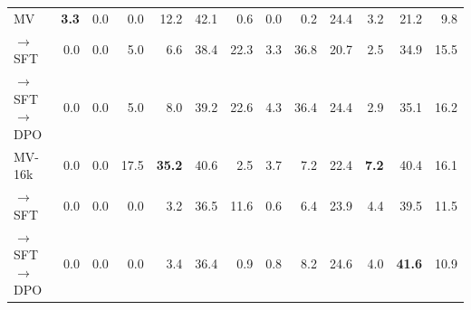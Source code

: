 \begin{table}[ht]
{\begin{tabular}{lrrrrrrrrrrrr}
\midrule
\addlinespace[0.3em]
MV & \textbf{3.3} & 0.0 & 0.0 & 12.2 & 42.1 & 0.6 & 0.0 & 0.2 & 24.4 & 3.2 & 21.2 & 9.8 \\
\quad $\to$ SFT & 0.0 & 0.0 & 5.0 & 6.6 & 38.4 & 22.3 & 3.3 & 36.8 & 20.7 & 2.5 & 34.9 & 15.5 \\
\quad $\to$ SFT $\to$ DPO & 0.0 & 0.0 & 5.0 & 8.0 & 39.2 & 22.6 & 4.3 & 36.4 & 24.4 & 2.9 & 35.1 & 16.2 \\
\midrule
\addlinespace[0.3em]
MV-16k & 0.0 & 0.0 & 17.5 & \textbf{35.2} & 40.6 & 2.5 & 3.7 & 7.2 & 22.4 & \textbf{7.2} & 40.4 & 16.1 \\
\quad $\to$ SFT & 0.0 & 0.0 & 0.0 & 3.2 & 36.5 & 11.6 & 0.6 & 6.4 & 23.9 & 4.4 & 39.5 & 11.5 \\
\quad $\to$ SFT $\to$ DPO & 0.0 & 0.0 & 0.0 & 3.4 & 36.4 & 0.9 & 0.8 & 8.2 & 24.6 & 4.0 & \textbf{41.6} & 10.9 \\
\bottomrule
\end{tabular}
}
\end{table}


